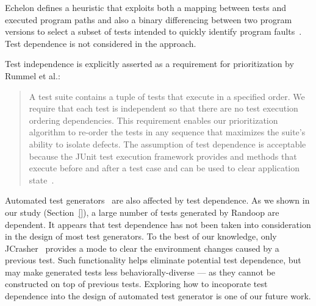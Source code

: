 Echelon defines a
heuristic that exploits both a mapping between tests and
executed program paths and also a binary differencing between two
program versions to select a subset of tests intended to quickly
identify program faults~\cite{Srivastava:2002:EPT:566172.566187}.
Test dependence is not considered in the approach.



Test independence is explicitly asserted as a requirement for
prioritization by Rummel et al.:
\begin{quote}
A test suite contains a tuple of tests  that execute in a specified order.  We require that each test is
independent so that there are no test execution ordering dependencies.  This requirement enables our prioritization algorithm to
re-order the tests in any sequence that maximizes the suite's
ability to isolate defects.  The assumption of test dependence
is acceptable because the JUnit test execution framework
provides  and  methods that execute before
and after a test case and can be used to clear application state~\cite[p.~1500]{Rummel:2005:TPR:1066677.1067016}.
\end{quote}

Automated test generators~\cite{} are also affected
by test dependence. As we shown in our study (Section~\ref{}),
a large number of tests generated by Randoop are dependent.
It appears that test dependence has not been taken into
consideration in the design of most test generators.
To the best of our knowledge, only JCrasher~\cite{Csallner:2004}
provides a mode to clear the environment changes caused
by a previous test. Such functionality helps eliminate
potential test dependence, but may make generated
tests less behaviorally-diverse --- as they cannot be constructed
on top of previous tests. Exploring how to
incoporate test dependence into the design of automated
test generator is one of our future work.

%





